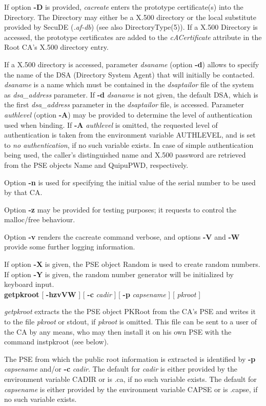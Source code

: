 If option {\bf -D} is provided, {\em cacreate} enters the prototype certificate(s)
into the Directory. 
The Directory may either be a X.500 directory or the local substitute provided by 
SecuDE ({\em .af-db}) (see also DirectoryType(5)).
If a X.500 Directory is accessed, the prototype certificates are added to the {\em cACertificate} 
attribute in the Root CA's X.500 directory entry.

If a X.500 directory is accessed, parameter {\em dsaname} (option {\bf -d}) allows to specify 
the name of the DSA (Directory System Agent) that
will initially be contacted. {\em dsaname} is a name which must be contained in the 
{\em dsaptailor} file of the system as {\em dsa\_address} parameter. If {\bf -d} {\em dsaname} is
not given, the default DSA, which is the first {\em dsa\_address} parameter in the {\em dsaptailor} 
file, is accessed. 
Parameter {\em authlevel} (option {\bf -A}) may be provided to determine the level of authentication used when binding. If {\bf -A} {\em authlevel} is omitted, the requested 
level of authentication is taken from the environment variable AUTHLEVEL, and is set to {\em no 
authentication}, if no such variable exists.
In case of simple authentication being used, the caller's distinguished name and
X.500 password are retrieved from the PSE objects Name and QuipuPWD, respectively.

Option {\bf -n} is used for specifying the initial value of the serial number to be used by that CA.
 
Option {\bf -z} may be provided for testing purposes; it requests to control the malloc/free behaviour.

Option {\bf -v} renders the cacreate command verbose, and options {\bf -V} and {\bf -W} provide some further logging information.

If option {\bf -X} is given, the PSE object Random
is used to create random numbers.
If option {\bf -Y} is given, the random number generator
will be initialized by keyboard input.
\\ [1em]
{\bf getpkroot} [ {\bf -hzvVW} ] [ {\bf -c} {\em cadir} ] [ {\bf -p} {\em capsename} ] [ {\em pkroot} ]

{\em getpkroot} extracts the the PSE object PKRoot from the CA's PSE
and writes it to the file {\em pkroot} or stdout, if {\em pkroot} is omitted. 
This file can be sent to a user of the CA by any means,
who may then install it on his own PSE with the command instpkroot (see below). 
 
The PSE from which the public root information is extracted is identified by {\bf -p} {\em capsename} and/or
{\bf -c} {\em cadir}. 
The default for {\em cadir} is either provided by the environment variable
CADIR or is .ca, if no such variable exists.
The default for {\em capsename} is either provided by the environment variable
CAPSE or is .capse, if no such variable exists.

